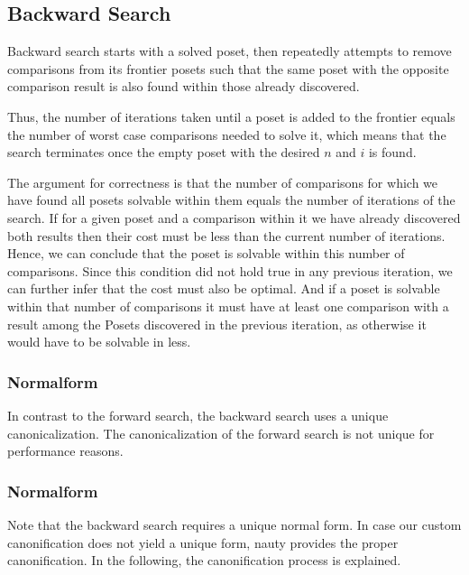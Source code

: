 \documentclass[10pt,journal,compsoc]{IEEEtran}
\begin{document}
\subsection{Backward Search} \label{sec:backward}

Backward search starts with a solved poset, then repeatedly attempts to remove comparisons from its
frontier posets such that the same poset with the opposite comparison result is also found within
those already discovered.

Thus, the number of iterations taken until a poset is added to the frontier equals the number of
worst case comparisons needed to solve it, which means that the search terminates once the empty
poset with the desired $n$ and $i$ is found.

The argument for correctness is that the number of comparisons for which we have found all posets solvable within them equals the number of iterations of the search.
If for a given poset and a comparison within it we have already discovered both results then their cost must be less than the current number of iterations. Hence, we can conclude that the poset is solvable within this number of comparisons.
Since this condition did not hold true in any previous iteration, we can further infer that the cost must also be optimal.
And if a poset is solvable within
that number of comparisons it must have at least one comparison with a result among the Posets
discovered in the previous iteration, as otherwise it would have to be solvable in less.


\subsubsection{Normalform} \label{sec:backward:normal_form}

In contrast to the forward search, the backward search uses a unique canonicalization. %
The canonicalization of the forward search is not unique for performance reasons.

\subsubsection{Normalform}
Note that the backward search requires a unique normal form. In case our custom canonification does not yield a unique form, nauty provides the proper canonification.
In the following, the canonification process is explained.
\end{document}
